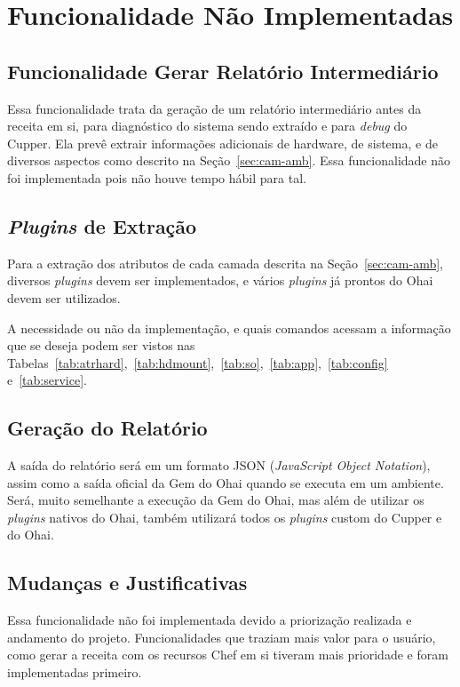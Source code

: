 \section{Funcionalidade Não Implementadas}
\label{sec:rel}

\subsection{Funcionalidade Gerar Relatório Intermediário}
Essa funcionalidade trata da geração de um relatório intermediário antes da
receita em si, para diagnóstico do sistema sendo extraído e para \textit{debug} do
Cupper. Ela prevê extrair informações adicionais de hardware, de sistema, e de
diversos aspectos como descrito na Seção~\ref{sec:cam-amb}. Essa funcionalidade
não foi implementada pois não houve tempo hábil para tal.

\subsection{\textit{Plugins} de Extração}
Para a extração dos atributos de cada camada descrita na Seção~\ref{sec:cam-amb},
diversos \textit{plugins} devem ser implementados, e vários \textit{plugins} já prontos do Ohai
devem ser utilizados.

A necessidade ou não da implementação, e quais comandos acessam a informação
que se deseja podem ser vistos nas Tabelas~\ref{tab:atrhard},~\ref{tab:hdmount},~\ref{tab:so},~\ref{tab:app},~\ref{tab:config} e~\ref{tab:service}.

\subsection{Geração do Relatório}
A saída do relatório será em um formato JSON (\textit{JavaScript Object Notation}),
assim como a saída oficial da Gem do Ohai quando se executa em um ambiente. Será,
muito semelhante a execução da Gem do Ohai, mas além de utilizar os \textit{plugins} nativos
do Ohai, também utilizará todos os \textit{plugins} custom do Cupper e do Ohai.

\subsection{Mudanças e Justificativas}
Essa funcionalidade não foi implementada devido a priorização realizada e andamento
do projeto. Funcionalidades que traziam mais valor para o usuário, como 
gerar a receita com os recursos Chef em si tiveram mais prioridade e foram implementadas
primeiro.
